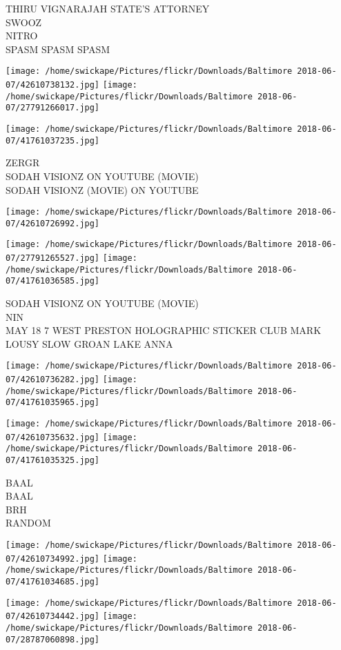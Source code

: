 \documentclass[10pt,letterpaper]{article}
\begin{document}
THIRU VIGNARAJAH STATE'S ATTORNEY\\
SWOOZ\\
NITRO\\
SPASM SPASM SPASM
\pagebreak

\texttt{[image: /home/swickape/Pictures/flickr/Downloads/Baltimore 2018-06-07/42610738132.jpg]}
\texttt{[image: /home/swickape/Pictures/flickr/Downloads/Baltimore 2018-06-07/27791266017.jpg]}

\texttt{[image: /home/swickape/Pictures/flickr/Downloads/Baltimore 2018-06-07/41761037235.jpg]}

ZERGR\\
SODAH VISIONZ ON YOUTUBE (MOVIE)\\
SODAH VISIONZ (MOVIE) ON YOUTUBE
\pagebreak

\texttt{[image: /home/swickape/Pictures/flickr/Downloads/Baltimore 2018-06-07/42610726992.jpg]}

\vspace{0.25in}
\texttt{[image: /home/swickape/Pictures/flickr/Downloads/Baltimore 2018-06-07/27791265527.jpg]}
\texttt{[image: /home/swickape/Pictures/flickr/Downloads/Baltimore 2018-06-07/41761036585.jpg]}

SODAH VISIONZ ON YOUTUBE (MOVIE)\\
NIN\\
MAY 18 7 WEST PRESTON HOLOGRAPHIC STICKER CLUB MARK LOUSY SLOW GROAN LAKE ANNA
\pagebreak

\texttt{[image: /home/swickape/Pictures/flickr/Downloads/Baltimore 2018-06-07/42610736282.jpg]}
\texttt{[image: /home/swickape/Pictures/flickr/Downloads/Baltimore 2018-06-07/41761035965.jpg]}

\texttt{[image: /home/swickape/Pictures/flickr/Downloads/Baltimore 2018-06-07/42610735632.jpg]}
\texttt{[image: /home/swickape/Pictures/flickr/Downloads/Baltimore 2018-06-07/41761035325.jpg]}

BAAL\\
BAAL\\
BRH\\
RANDOM
\pagebreak

\texttt{[image: /home/swickape/Pictures/flickr/Downloads/Baltimore 2018-06-07/42610734992.jpg]}
\texttt{[image: /home/swickape/Pictures/flickr/Downloads/Baltimore 2018-06-07/41761034685.jpg]}

\texttt{[image: /home/swickape/Pictures/flickr/Downloads/Baltimore 2018-06-07/42610734442.jpg]}
\texttt{[image: /home/swickape/Pictures/flickr/Downloads/Baltimore 2018-06-07/28787060898.jpg]}
\end{document}
